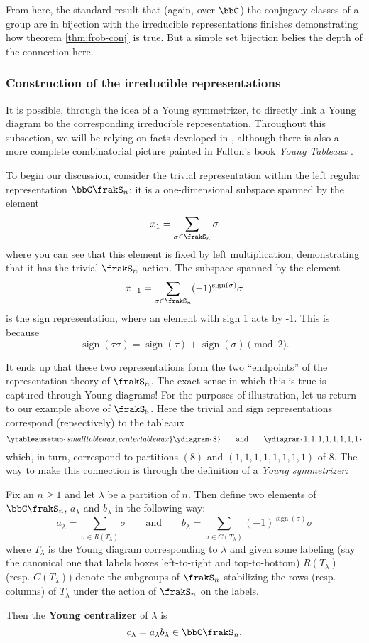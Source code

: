 \documentclass[12pt]{article}
\begin{document}
From here, the standard result that (again, over $\bbC$) the conjugacy classes of a group are in bijection with the irreducible representations finishes demonstrating how 
theorem \ref{thm:frob-conj} is true. But a simple set bijection belies the depth of the connection here. 

\subsubsection*{Construction of the irreducible representations}
It is possible, through the idea of a Young symmetrizer, to directly link a Young diagram to the corresponding 
irreducible representation. Throughout this subsection, we will be relying on facts developed in \cite{fulton-harris}, 
although there is also a more complete combinatorial picture painted in Fulton's book \textit{Young Tableaux} \cite{fulton-tableaux}. 

To begin our discussion, consider the trivial representation within the left regular representation $\bbC\frakS_n$: 
it is a one-dimensional subspace spanned by the element 
\[x_1=\sum_{\sigma\in\frakS_n}\sigma\]
where you can see that this element is fixed by left multiplication, demonstrating that it has the trivial $\frakS_n$ action.
The subspace spanned by the element 
\[x_{-1}=\sum_{\sigma\in\frakS_n}(-1)^{\operatorname{sign}(\sigma)}\sigma\]
is the sign representation, where an element with sign 1 acts by -1. This is because
\[\operatorname{sign}(\tau\sigma)=\operatorname{sign}(\tau)+\operatorname{sign}(\sigma)\pmod{2}.\]

It ends up that these two representations form the two ``endpoints'' of the representation theory of $\frakS_n$. The exact sense in which this is 
true is captured through Young diagrams! For the purposes of illustration, let us return to our example above of $\frakS_8$. Here the trivial and sign representations 
correspond (repsectively) to the tableaux
\[\ytableausetup{smalltableaux,centertableaux}\ydiagram{8}\qquad\text{and}\qquad\ydiagram{1,1,1,1,1,1,1,1}\]
which, in turn, correspond to partitions $(8)$ and $(1,1,1,1,1,1,1,1)$ of $8$. The way to make this connection is through the definition 
of a \textit{Young symmetrizer:}
\begin{defn}
	Fix an $n\ge 1$ and let $\lambda$ be a partition of $n$. Then define two elements of $\bbC\frakS_n$, $a_\lambda$ and $b_\lambda$ in the following way:
	\[a_\lambda=\sum_{\sigma\in R(T_\lambda)}\sigma\qquad\text{and}\qquad b_\lambda=\sum_{\sigma\in C(T_\lambda)}(-1)^{\operatorname{sign}(\sigma)}\sigma\]
	where $T_\lambda$ is the Young diagram corresponding to $\lambda$ and given some labeling (say the canonical one that labels boxes left-to-right and top-to-bottom)
	$R(T_\lambda)$ (resp. $C(T_\lambda)$) denote the subgroups of $\frakS_n$ stabilizing the rows (resp. columns) of $T_\lambda$ under the action of $\frakS_n$ on the labels.

	Then the \textbf{Young centralizer} of $\lambda$ is 
	\[c_\lambda=a_\lambda b_\lambda\in\bbC\frakS_n.\]
\end{defn}
\end{document}

